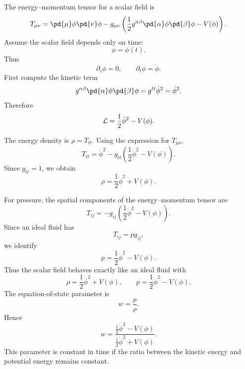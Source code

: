 \begin{solution}[(ii)]
  The energy--momentum tensor for a scalar field is
  \[%
    T_{\mu\nu} = \pd{\mu}\phi\pd{\nu}\phi - g_{\mu\nu} \left(\frac{1}{2}g^{\alpha\beta}\pd{\alpha}\phi\pd{\beta}\phi - V(\phi) \right)
  .\]%
  Assume the scalar field depends only on time:
  \[
    \phi=\phi(t).
  \]
  Thus
  \[
    \partial_i\phi=0, \qquad \partial_t\phi=\dot\phi.
  \]
  First compute the kinetic term
  \[%
    g^{\alpha\beta}\pd{\alpha}\phi\pd{\beta}\phi = g^{tt}\dot{\phi}^2 = \dot{\phi}^2
  .\]%
  Therefore
  \[%
    \L = \frac{1}{2} \dot{\phi}^2 - V(\phi)
  .\]%

  The energy density is $\rho = T_{tt}$. Using the expression for $T_{\mu\nu}$,
  \[%
    T_{tt} = \dot{\phi}^2 - g_{tt}\left(\frac{1}{2}\dot{\phi}^2 - V(\phi)\right)
  .\]%
  Since $g_{tt}=1$, we obtain
  \[%
    \rho = \frac{1}{2}\dot{\phi}^2 + V(\phi)
  .\]%

  For pressure, the spatial components of the energy--momentum tensor are
  \[%
    T_{ij} = - g_{ij}\left(\frac{1}{2}\dot{\phi}^2 - V(\phi)\right)
  .\]%
  Since an ideal fluid has
  \[%
    T_{ij} = p g_{ij}
  ,\]%
  we identify
  \[%
    p = \frac{1}{2}\dot{\phi}^2 - V(\phi)
  .\]%
  Thus the scalar field behaves exactly like an ideal fluid with
  \[%
    \rho = \frac{1}{2}\dot{\phi}^2 + V(\phi), \qquad p = \frac{1}{2}\dot{\phi}^2 - V(\phi)
  .\]%
  The equation-of-state parameter is
  \[%
    w = \frac{p}{\rho}
  .\]%
  Hence
  \[%
    w = \frac{\frac{1}{2}\dot{\phi}^2 - V(\phi)} {\frac{1}{2}\dot{\phi}^2 + V(\phi)}
  .\]%
  This parameter is constant in time if the ratio between the kinetic energy and potential energy remains constant.
\end{solution}
